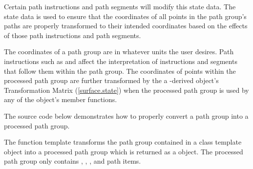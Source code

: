 \pnum
Certain path instructions and path segments will modify this state data. The state data is used to ensure that the coordinates of all points in the path group's paths are properly transformed to their intended coordinates based on the effects of those path instructions and path segments.

\pnum
\enternote
The coordinates of a path group are in whatever units the user desires. Path instructions such as  and  affect the interpretation of instructions and segments that follow them within the path group. The coordinates of points within the processed path group are further transformed by the a -derived object's Transformation Matrix (\ref{surface.state}) when the processed path group is used by any of the object's member functions.
\exitnote

\pnum
The source code below demonstrates how to properly convert a path group into a processed path group.

\pnum
The  function template transforms the path group contained in a  class template object into a processed path group which is returned as a  object. The processed path group only contains , , , and  path items.



%
%
%
%  
%  
%
%

\addtocounter{SectionDepthBase}{1}
















\addtocounter{SectionDepthBase}{-1}
